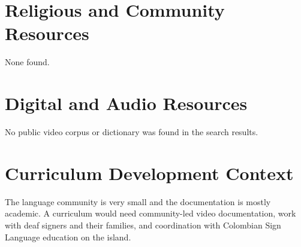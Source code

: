 \documentclass[12pt]{article}
\begin{document}
\section{Religious and Community Resources}
None found.

\section{Digital and Audio Resources}
No public video corpus or dictionary was found in the search results.

\section{Curriculum Development Context}
The language community is very small and the documentation is mostly academic. A curriculum would need community-led video documentation, work with deaf signers and their families, and coordination with Colombian Sign Language education on the island.
\end{document}
